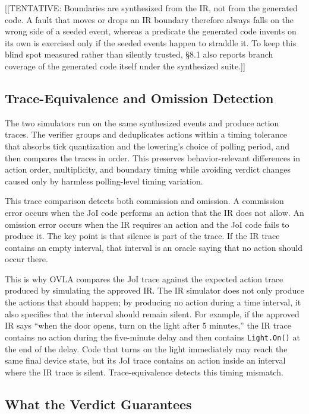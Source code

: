 \documentclass[sigconf,nonacm,anonymous,review]{acmart}
\begin{document}
[[TENTATIVE: Boundaries are synthesized from the IR, not from the generated code. A fault that moves or drops an IR boundary therefore always falls on the wrong side of a seeded event, whereas a predicate the generated code invents on its own is exercised only if the seeded events happen to straddle it. To keep this blind spot measured rather than silently trusted, \S8.1 also reports branch coverage of the generated code itself under the synthesized suite.]]

\subsection{Trace-Equivalence and Omission Detection}

The two simulators run on the same synthesized events and produce action traces. The verifier groups and deduplicates actions within a timing tolerance that absorbs tick quantization and the lowering's choice of polling period, and then compares the traces in order. This preserves behavior-relevant differences in action order, multiplicity, and boundary timing while avoiding verdict changes caused only by harmless polling-level timing variation.

This trace comparison detects both commission and omission. A commission error occurs when the JoI code performs an action that the IR does not allow. An omission error occurs when the IR requires an action and the JoI code fails to produce it. The key point is that silence is part of the trace. If the IR trace contains an empty interval, that interval is an oracle saying that no action should occur there.

This is why OVLA compares the JoI trace against the expected action trace produced by simulating the approved IR. The IR simulator does not only produce the actions that should happen; by producing no action during a time interval, it also specifies that the interval should remain silent. For example, if the approved IR says ``when the door opens, turn on the light after 5 minutes,'' the IR trace contains no action during the five-minute delay and then contains \texttt{Light.On()} at the end of the delay. Code that turns on the light immediately may reach the same final device state, but its JoI trace contains an action inside an interval where the IR trace is silent. Trace-equivalence detects this timing mismatch.

\subsection{What the Verdict Guarantees}
\end{document}
